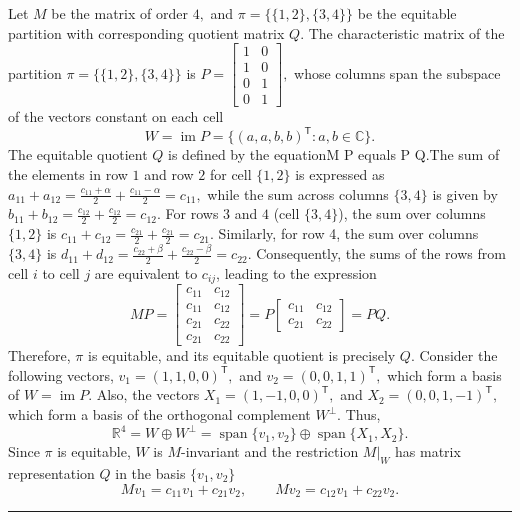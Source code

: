 \documentclass[12pt,twoside]{article}
\renewenvironment{proof}{{\noindent\bfseries Proof.}}{\qed}
\def\qed{\nolinebreak\hfill\rule{.2cm}{.2cm}\par\addvspace{.5cm}}
\begin{document}
\begin{proof}
	Let $M$ be the matrix of order $4,$ and $\pi=\{\{1,2\},\{3,4\}\}$ be the equitable partition with corresponding quotient matrix $Q$. 	The characteristic matrix of the partition $\pi=\{\{1,2\},\{3,4\}\}$ is  $P=
	\begin{bmatrix}
		1 & 0\\
		1 & 0\\
		0 & 1\\
		0 & 1
	\end{bmatrix},$	whose columns span the subspace of the vectors constant on each cell
	$$
	W = \operatorname{im}P
	=
	\{(a,a,b,b)^\mathsf{T} : a,b\in\mathbb{C}\}.
	$$
	The equitable quotient \( Q \) is defined by the equationM P equals P Q.The sum of the elements in row $1$ and row $2$ for cell $\{1,2\}$ is expressed as $a_{11}+a_{12} = \frac{c_{11}+\alpha}{2}+\frac{c_{11}-\alpha}{2}=c_{11},$ while the sum across columns $\{3,4\}$ is given by $b_{11}+b_{12} = \frac{c_{12}}{2}+\frac{c_{12}}{2}=c_{12}.$ For rows $3$ and $4$ (cell $\{3,4\}$), the sum over columns $\{1,2\}$ is \( c_{11} + c_{12} = \frac{c_{21}}{2} + \frac{c_{21}}{2} = c_{21} \). Similarly, for row 4, the sum over columns $\{3,4\}$ is \( d_{11} + d_{12} = \frac{c_{22} + \beta}{2} + \frac{c_{22} - \beta}{2} = c_{22} \). Consequently, the sums of the rows from cell $i$ to cell $j$ are equivalent to $c_{ij}$, leading to the expression
	 $$M P = \begin{bmatrix} c_{11} & c_{12}\\ c_{11} & c_{12}\\ c_{21} & c_{22}\\ c_{21} & c_{22} \end{bmatrix} = P \begin{bmatrix} c_{11} & c_{12}\\ c_{21} & c_{22} \end{bmatrix} = P Q.$$ Therefore, $\pi$ is equitable, and its equitable quotient is precisely $Q$.
	 Consider the following vectors, $v_1 = (1,1,0,0)^\mathsf{T},$ and $	v_2 = (0,0,1,1)^\mathsf{T},$ which form a basis of $W=\operatorname{im}P$. Also, the vectors $X_1 = (1,-1,0,0)^\mathsf{T},$ and $X_2 = (0,0,1,-1)^\mathsf{T},$	which form a basis of the orthogonal complement $W^\perp$. Thus, 
	$$
	\mathbb{R}^4 = W \oplus W^\perp
	= \operatorname{span}\{v_1,v_2\} \oplus \operatorname{span}\{X_1,X_2\}.
	$$
	Since $\pi$ is equitable, $W$ is $M$-invariant and the restriction
	$M|_W$ has matrix representation $Q$ in the basis $\{v_1,v_2\}$
	$$
	M v_1 = c_{11} v_1 + c_{21} v_2,\qquad
	M v_2 = c_{12} v_1 + c_{22} v_2.
$$
\end{proof}
\end{document}
